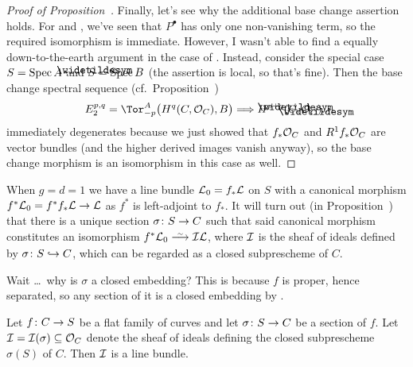 \documentclass[a4paper,parskip=half,numbers=enddot, DIV=12]{scrreprt}
\begin{document}
\begin{proof}[Proof of Proposition~]
	Finally, let's see why the additional base change assertion holds. For  and , we've seen that $P^\bullet$ has only one non-vanishing term, so the required isomorphism is immediate. However, I wasn't able to find a equally down-to-the-earth argument in the case of . Instead, consider the special case $S=\operatorname{Spec} A$ and $\snake{S}=\Spec B$ (the assertion is local, so that's fine). Then the base change spectral sequence (cf.\ Proposition~)
	\begin{align*}
		E_2^{p,q}=\Tor_{-p}^A\big(H^q(C,\Oo_C),B\big)\converge H^{p+q}(\snake{C},\Oo_{\snake{C}})\;.
	\end{align*}
	immediately degenerates because we just showed that $f_*\mathcal{O}_C$ and $R^1f_*\mathcal{O}_C$ are vector bundles (and the higher derived images vanish anyway), so the base change morphism is an isomorphism in this case as well.
\end{proof}
\begin{rem}
	When $g=d=1$ we have a line bundle $\mathcal{L}_0=f_*\mathcal{L}$ on $S$ with a canonical morphism $f^*\Ll_0=f^*f_*\Ll\morphism\Ll$ as $f^*$ is left-adjoint to $f_*$. It will turn out (in Proposition~) that there is a unique section $\sigma\colon S\morphism C$ such that said canonical morphism constitutes an isomorphism $f^*\Ll_0\isomorphism\Ii\Ll$, where $\mathcal{I}$ is the sheaf of ideals defined by $\sigma\colon S\monomorphism C$, which can be regarded as a closed subprescheme of $C$.
	
	Wait \ldots\ why is $\sigma$ a closed embedding? This is because $f$ is proper, hence separated, so any section of it is a closed embedding by \cite[Proposition~1.5.5]{alggeo1}.
\end{rem}
\begin{lem}
	Let $f\colon C\morphism S$ be a flat family of curves and let $\sigma\colon S\morphism C$ be a section of $f$. Let $\mathcal{I}=\mathcal{I}(\sigma)\subseteq \mathcal{O}_C$ denote the sheaf of ideals defining the closed subprescheme $\sigma(S)$ of $C$. Then $\mathcal{I}$ is a line bundle.
\end{lem}
\end{document}
